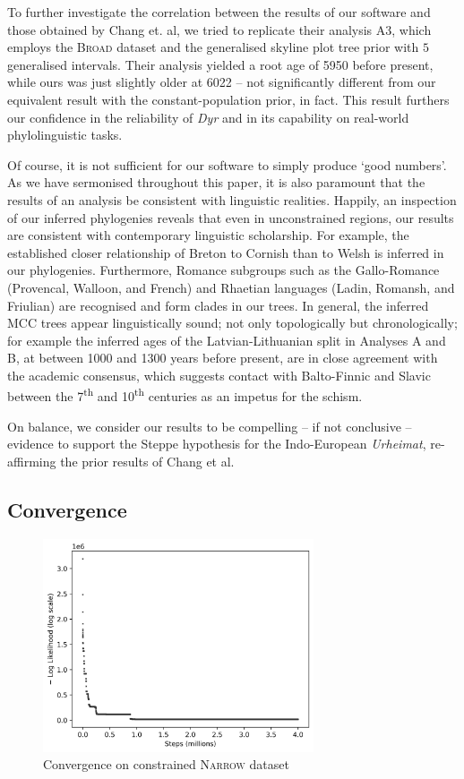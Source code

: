 \documentclass[10pt,journal,compsoc]{IEEEtran}
\newcommand{\ts}{\textsuperscript}
\begin{document}
To further investigate the correlation between the results of our software and those obtained by Chang et. al, we tried to replicate their analysis A3, which employs the \textsc{Broad} dataset and the generalised skyline plot tree prior with $5$ generalised intervals. Their analysis yielded a root age of 5950 before present, while ours was just slightly older at 6022 -- not significantly different from our equivalent result with the constant-population prior, in fact. This result furthers our confidence in the reliability of \textit{Dyr} and in its capability on real-world phylolinguistic tasks.

Of course, it is not sufficient for our software to simply produce `good numbers'. As we have sermonised throughout this paper, it is also paramount that the results of an analysis be consistent with linguistic realities. Happily, an inspection of our inferred phylogenies reveals that even in unconstrained regions, our results are consistent with contemporary linguistic scholarship. For example, the established closer relationship of Breton to Cornish than to Welsh is inferred in our phylogenies. Furthermore, Romance subgroups such as the Gallo-Romance (Provencal, Walloon, and French) and Rhaetian languages (Ladin, Romansh, and Friulian) are recognised and form clades in our trees. In general, the inferred MCC trees appear linguistically sound; not only topologically but chronologically; for example the inferred ages of the Latvian-Lithuanian split in Analyses A and B, at between 1000 and 1300 years before present, are in close agreement with the academic consensus, which suggests contact with Balto-Finnic and Slavic between the 7\ts{th} and 10\ts{th} centuries as an impetus for the schism\cite{baltic2018}.

On balance, we consider our results to be compelling -- if not conclusive -- evidence to support the Steppe hypothesis for the Indo-European \textit{Urheimat}, re-affirming the prior results of Chang et al.

\subsection{Convergence}

\begin{figure}
\caption{Convergence on constrained \textsc{Narrow} dataset}\label{fig:convergence}
\includegraphics[width=8cm,center]{convergence}
\end{figure}
\end{document}

